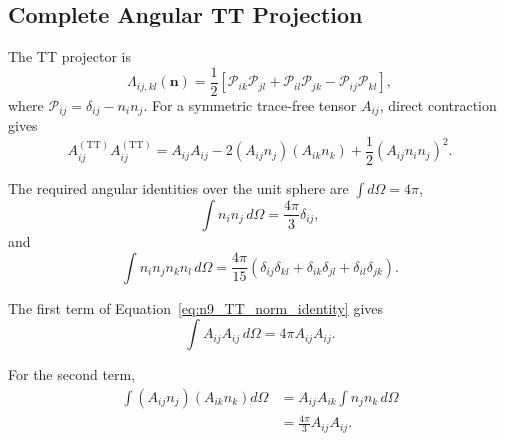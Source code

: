 \subsection{Complete Angular TT Projection}
\label{subsec:n9_complete_angular_projection}

The TT projector is
\begin{equation}
    \Lambda_{ij,kl}(\mathbf{n}) = \frac{1}{2} \left[ \mathcal{P}_{ik}\mathcal{P}_{jl} + \mathcal{P}_{il}\mathcal{P}_{jk} - \mathcal{P}_{ij}\mathcal{P}_{kl} \right],
\end{equation}
where $\mathcal{P}_{ij} = \delta_{ij}-n_{i}n_{j}$. For a symmetric trace-free tensor $A_{ij}$, direct contraction gives
\begin{equation}
    A_{ij}^{(\mathrm{TT})} A_{ij}^{(\mathrm{TT})} = A_{ij}A_{ij} - 2 \left( A_{ij}n_{j} \right) \left( A_{ik}n_{k} \right) + \frac{1}{2} \left( A_{ij}n_{i}n_{j} \right)^{2}.
    \label{eq:n9_TT_norm_identity}
\end{equation}

The required angular identities over the unit sphere are $\int d\Omega = 4\pi$,
\begin{equation}
    \int n_{i}n_{j} \,d\Omega = \frac{4\pi}{3} \delta_{ij},
    \label{eq:n9_second_angular_moment}
\end{equation}
and
\begin{equation}
    \int n_{i}n_{j}n_{k}n_{l} \,d\Omega = \frac{4\pi}{15} \left( \delta_{ij}\delta_{kl} + \delta_{ik}\delta_{jl} + \delta_{il}\delta_{jk} \right).
    \label{eq:n9_fourth_angular_moment}
\end{equation}

The first term of Equation~\eqref{eq:n9_TT_norm_identity} gives
\begin{equation}
    \int A_{ij}A_{ij} \,d\Omega = 4\pi A_{ij}A_{ij}.
    \label{eq:n9_first_angular_term}
\end{equation}

For the second term,
\begin{equation}
    \begin{aligned}
        \int \left( A_{ij}n_{j} \right) \left( A_{ik}n_{k} \right) d\Omega &= A_{ij}A_{ik} \int n_{j}n_{k} \,d\Omega \\
        &= \frac{4\pi}{3} A_{ij}A_{ij}.
    \end{aligned}
    \label{eq:n9_second_angular_term}
\end{equation}

